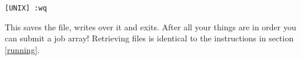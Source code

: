 \documentclass{article}
\begin{document}
\vspace{2mm}
\texttt{[UNIX] :wq }
\vspace{2mm}

\noindent This saves the file, writes over it and exits.
\vspace{2mm}
\noindent After all your things are in order you can submit a job array! Retrieving files is identical to the instructions in section \ref{running}.
















\end{document}
